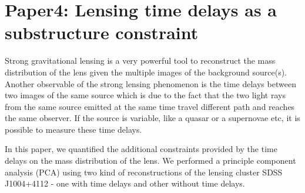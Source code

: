 \chapter{Paper4: Lensing time delays as a substructure constraint}\label{paper:timedelays}

Strong gravitational lensing is a very powerful tool to reconstruct the mass distribution
of the lens given the multiple images of the background source(s). Another observable
of the strong lensing phenomenon is the time delays between two images of the same source
which is due to the fact that the two light rays from the same source emitted at the
same time travel different path and reaches the same observer. If the source is variable,
like a quasar or a supernovae etc, it is possible to measure these time delays. 

In this paper, we quantified the additional constraints provided by the time delays
on the mass distribution of the lens. We performed a principle component analysis (PCA)
using two kind of reconstructions of the lensing cluster SDSS J1004+4112 - one with
time delays and other without time delays. 

\clearpage
